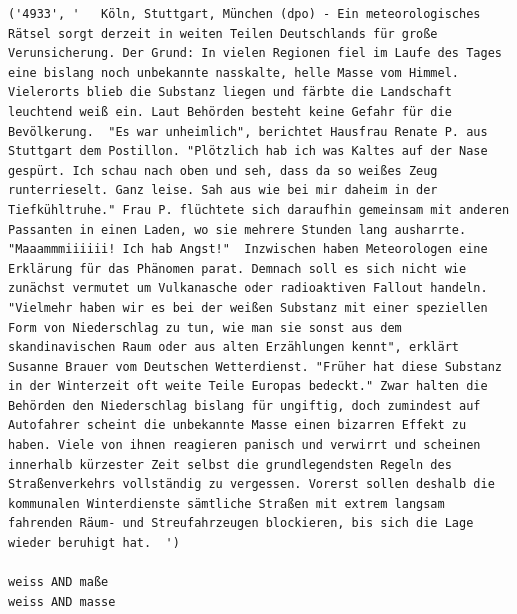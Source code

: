 \documentclass[a4paper]{scrartcl}
\begin{document}
\begin{lstlisting}
('4933', '   Köln, Stuttgart, München (dpo) - Ein meteorologisches Rätsel sorgt derzeit in weiten Teilen Deutschlands für große Verunsicherung. Der Grund: In vielen Regionen fiel im Laufe des Tages eine bislang noch unbekannte nasskalte, helle Masse vom Himmel. Vielerorts blieb die Substanz liegen und färbte die Landschaft leuchtend weiß ein. Laut Behörden besteht keine Gefahr für die Bevölkerung.  "Es war unheimlich", berichtet Hausfrau Renate P. aus Stuttgart dem Postillon. "Plötzlich hab ich was Kaltes auf der Nase gespürt. Ich schau nach oben und seh, dass da so weißes Zeug runterrieselt. Ganz leise. Sah aus wie bei mir daheim in der Tiefkühltruhe." Frau P. flüchtete sich daraufhin gemeinsam mit anderen Passanten in einen Laden, wo sie mehrere Stunden lang ausharrte.    "Maaammmiiiiii! Ich hab Angst!"  Inzwischen haben Meteorologen eine Erklärung für das Phänomen parat. Demnach soll es sich nicht wie zunächst vermutet um Vulkanasche oder radioaktiven Fallout handeln. "Vielmehr haben wir es bei der weißen Substanz mit einer speziellen Form von Niederschlag zu tun, wie man sie sonst aus dem skandinavischen Raum oder aus alten Erzählungen kennt", erklärt Susanne Brauer vom Deutschen Wetterdienst. "Früher hat diese Substanz in der Winterzeit oft weite Teile Europas bedeckt." Zwar halten die Behörden den Niederschlag bislang für ungiftig, doch zumindest auf Autofahrer scheint die unbekannte Masse einen bizarren Effekt zu haben. Viele von ihnen reagieren panisch und verwirrt und scheinen innerhalb kürzester Zeit selbst die grundlegendsten Regeln des Straßenverkehrs vollständig zu vergessen. Vorerst sollen deshalb die kommunalen Winterdienste sämtliche Straßen mit extrem langsam fahrenden Räum- und Streufahrzeugen blockieren, bis sich die Lage wieder beruhigt hat.  ') 

weiss AND maße
weiss AND masse
\end{lstlisting}
\end{document}
